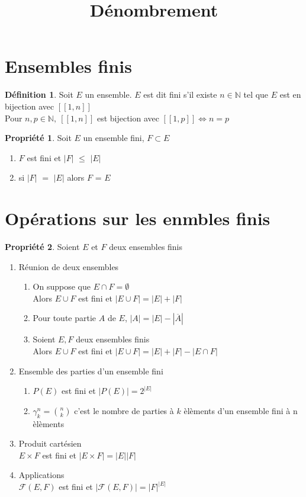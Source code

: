 \documentclass[fleqn]{article}
\title{D\'enombrement}
\date{}
\theoremstyle{definition} \newtheorem*{defi}{D\'efinition}
\theoremstyle{definition} \newtheorem*{theo}{Th\'eor\`eme}
\theoremstyle{definition} \newtheorem*{coro}{Corollaire}
\theoremstyle{remark} \newtheorem*{rqs}{Remarques}
\theoremstyle{definition} \newtheorem*{prop}{Propri\'et\'e}
\begin{document}
\maketitle

\section{Ensembles finis}
\begin{defi}
	Soit $E$ un ensemble. $E$ est dit fini s'il existe $n \in \mathbb{N}$ tel que $E$ est en bijection avec $[\![1,n]\!]$ \\
	Pour $n, p \in \mathbb{N},\ [\![1,n]\!]$ est bijection avec $[\![1,p]\!] \Leftrightarrow n = p$
\end{defi}

\begin{prop} Soit $E$ un ensemble fini, $F \subset E$
	\begin{enumerate}
		\item $F$ est fini et $|F|$ $\leq$ $|E|$
		\item si $|F|$ $=$ $|E|$ alors $F$ = $E$
	\end{enumerate}
\end{prop}

\section{Op\'erations sur les enmbles finis}
\begin{prop} Soient $E$ et $F$ deux ensembles finis
	\begin{enumerate}
		\item R\'eunion de deux ensembles
			\begin{enumerate}
				\item On suppose que $E \cap F = \emptyset$ \\
					Alors $E \cup F$ est fini et $|E \cup F| = |E| + |F|$
				\item Pour toute partie $A$ de $E$, $|A| = |E| - |\overline{A}|$
				\item Soient $E, F$ deux ensembles finis \\
					Alors $E\cup F$ est fini et $|E \cup F| = |E| + |F| - |E \cap F|$
			\end{enumerate}
		\item Ensemble des parties d'un ensemble fini
			\begin{enumerate}
			\item $P(E)$ est fini et $|P(E)| = 2^{|E|}$
			\item $\gamma_k^n = \binom{n}{k}$ c'est le nombre de parties \`a $k$ \`el\`ements d'un ensemble fini \`a n \`el\`ements
			\end{enumerate}
		\item Produit cart\'esien \\
			$E\times F$ est fini et $|E\times F| = |E||F|$
		\item Applications \\
			$\mathcal{F}(E,F)$ est fini et $|\mathcal{F}(E,F)| = |F|^{|E|}$
	\end{enumerate}
\end{prop}
\end{document}
